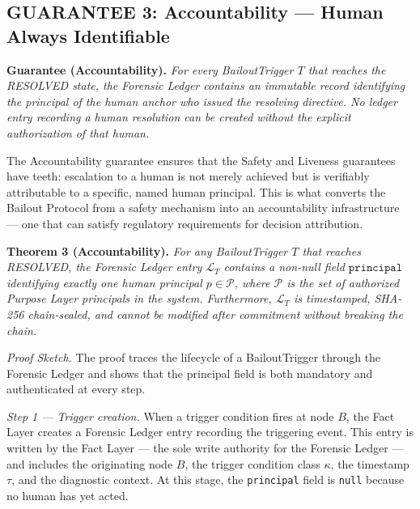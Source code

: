 \subsection{GUARANTEE 3: Accountability — Human Always Identifiable}
\label{sec:guarantee-accountability}

\bigskip

\begin{minipage}{\tmpdimb}
\textbf{Guarantee (Accountability).} \textit{For every BailoutTrigger $T$ that reaches the RESOLVED state, the Forensic Ledger contains an immutable record identifying the principal of the human anchor who issued the resolving directive. No ledger entry recording a human resolution can be created without the explicit authorization of that human.}
\end{minipage}

\bigskip

The Accountability guarantee ensures that the Safety and Liveness guarantees have teeth: escalation to a human is not merely achieved but is verifiably attributable to a specific, named human principal. This is what converts the Bailout Protocol from a safety mechanism into an accountability infrastructure — one that can satisfy regulatory requirements for decision attribution.

\bigskip

\noindent\textbf{Theorem 3 (Accountability).}
\textit{For any BailoutTrigger $T$ that reaches RESOLVED, the Forensic Ledger entry $\mathcal{L}_T$ contains a non-null field $\texttt{principal}$ identifying exactly one human principal $p \in \mathcal{P}$, where $\mathcal{P}$ is the set of authorized Purpose Layer principals in the system. Furthermore, $\mathcal{L}_T$ is timestamped, SHA-256 chain-sealed, and cannot be modified after commitment without breaking the chain.}

\bigskip

\noindent\textit{Proof Sketch.} The proof traces the lifecycle of a BailoutTrigger through the Forensic Ledger and shows that the principal field is both mandatory and authenticated at every step.

\medskip

\noindent\textit{Step 1 — Trigger creation.} When a trigger condition fires at node $B$, the Fact Layer creates a Forensic Ledger entry recording the triggering event. This entry is written by the Fact Layer — the sole write authority for the Forensic Ledger — and includes the originating node $B$, the trigger condition class $\kappa$, the timestamp $\tau$, and the diagnostic context. At this stage, the \texttt{principal} field is \texttt{null} because no human has yet acted.


